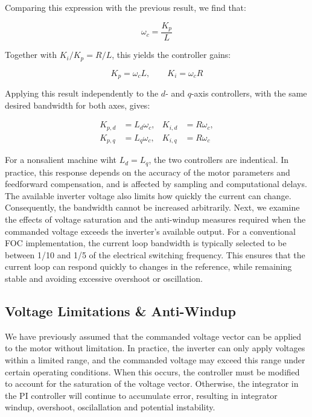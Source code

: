 \documentclass{article}
\begin{document}
Comparing this expression with the previous result, we find that:

\begin{equation}
    \omega_c = \frac{K_p}{L}
\end{equation}

Together with $K_i/K_p = R/L$, this yields the controller gains:

\begin{equation}
    K_p = \omega_cL, \qquad
    K_i = \omega_cR
\end{equation}

Applying this result independently to the $d$- and $q$-axis controllers, with the same desired bandwidth for both axes, gives:

\begin{equation}
    \begin{aligned}
        K_{p,d} &= L_d\omega_c, &
        K_{i,d} &= R\omega_c, \\
        K_{p,q} &= L_q\omega_c, &
        K_{i,q} &= R\omega_c
    \end{aligned}
\end{equation}

For a nonsalient machine wiht $L_d = L_q$, the two controllers are indentical. In practice, this response depends on the accuracy of the motor parameters and feedforward compensation, and is affected by sampling and computational delays. The available inverter voltage also limits how quickly the current can change. Consequently, the bandwidth cannot be increased arbitrarily. Next, we examine the effects of voltage saturation and the anti-windup measures required when the commanded voltage exceeds the inverter's available output. For a conventional FOC implementation, the current loop bandwidth is typically selected to be between 1/10 and 1/5 of the electrical switching frequency. This ensures that the current loop can respond quickly to changes in the reference, while remaining stable and avoiding excessive overshoot or oscillation.

\subsection{Voltage Limitations \& Anti-Windup}
\label{sec:voltage-limitations-and-anti-windup}

We have previously assumed that the commanded voltage vector can be applied to the motor without limitation. In practice, the inverter can only apply voltages within a limited range, and the commanded voltage may exceed this range under certain operating conditions. When this occurs, the controller must be modified to account for the saturation of the voltage vector. Otherwise, the integrator in the PI controller will continue to accumulate error, resulting in integrator windup, overshoot, oscilallation and potential instability.
\end{document}
